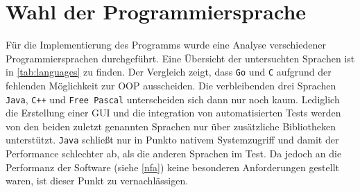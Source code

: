 \section{Wahl der Programmiersprache}
\label{sec:language}
Für die Implementierung des Programms wurde eine Analyse verschiedener Programmiersprachen durchgeführt. Eine Übersicht der untersuchten Sprachen ist in \autoref{tab:languages} zu finden. Der Vergleich zeigt, dass \texttt{Go} und \texttt{C} aufgrund der fehlenden Möglichkeit zur \gls{OOP} ausscheiden. Die verbleibenden drei Sprachen \texttt{Java}, \texttt{C++} und \texttt{Free Pascal} unterscheiden sich dann nur noch kaum. Lediglich die Erstellung einer \gls{GUI} und die integration von automatisierten Tests werden von den beiden zuletzt genannten Sprachen nur über zusätzliche Bibliotheken unterstützt. \texttt{Java} schließt nur in Punkto nativem Systemzugriff und damit der Performance schlechter ab, als die anderen Sprachen im Test. Da jedoch an die Performanz der Software (siehe \autoref{nfa}) keine besonderen Anforderungen gestellt waren, ist dieser Punkt zu vernachlässigen. 

